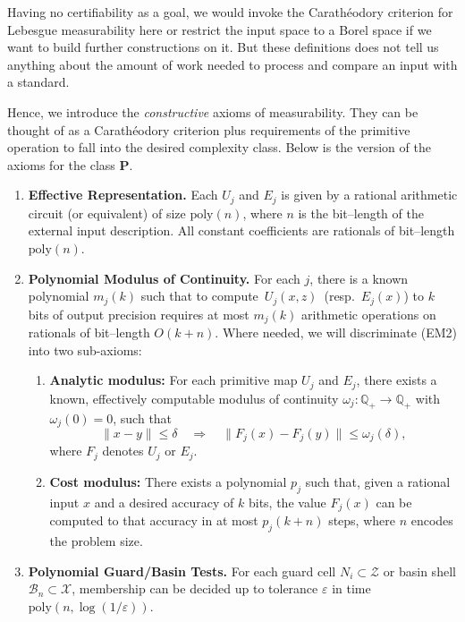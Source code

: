 \documentclass[12pt]{article}
\theoremstyle{definition}
\theoremstyle{plain}
\begin{document}
Having no certifiability as a goal, we would invoke the Carathéodory criterion for Lebesgue measurability here or restrict the input space to a Borel space if we want to build further constructions on it. But these definitions does not tell us anything about the amount of work needed to process and compare an input with a standard.

Hence, we introduce the \emph{constructive} axioms of measurability. They can be thought of as a Carathéodory criterion plus requirements of the primitive operation to fall into the desired complexity class. Below is the version of the axioms for the class $\mathbf{P}$.

\begin{enumerate}[label=(EM\arabic*), leftmargin=2em]
  \item \textbf{Effective Representation.}
        Each \(U_j\) and \(E_j\) is given by a rational arithmetic circuit (or equivalent) of size \(\mathrm{poly}(n)\), where \(n\) is the bit–length of the external input description.  All constant coefficients are rationals of bit–length \(\mathrm{poly}(n)\).

  \item \textbf{Polynomial Modulus of Continuity.}
        For each \(j\), there is a known polynomial \(m_j(k)\) such that to compute
        \(\,U_j(x,z)\,\) (resp.\ \(E_j(x)\)) to \(k\) bits of output precision requires at most
        \(m_j(k)\) arithmetic operations on rationals of bit–length \(O(k + n)\).
        Where needed, we will discriminate (EM2) into two sub-axioms:
        \begin{enumerate}[label=(EM2\alph*)]
            \item \textbf{Analytic modulus:}                     
                For each primitive map $U_j$ and $E_j$, there exists a known, effectively computable modulus of continuity $\omega_j : \mathbb{Q}_+ \to \mathbb{Q}_+$ with $\omega_j(0)=0$, such that
                \[
                \|x - y\| \le \delta \quad\Rightarrow\quad \|F_j(x) - F_j(y)\| \le \omega_j(\delta),
                \]
                where $F_j$ denotes $U_j$ or $E_j$.
            \item \textbf{Cost modulus:}            
                There exists a polynomial $p_j$ such that, given a rational input $x$ and a desired accuracy of $k$ bits, the value $F_j(x)$ can be computed to that accuracy in at most $p_j(k+n)$ steps, where $n$ encodes the problem size.
        \end{enumerate}

  \item \textbf{Polynomial Guard/Basin Tests.}
        For each guard cell \(N_i\subset\mathcal Z\) or basin shell \(\mathcal B_n\subset\mathcal X\),
        membership can be decided up to tolerance \(\varepsilon\) in time
        \(\mathrm{poly}(n,\log(1/\varepsilon))\).
\end{enumerate}
\end{document}
